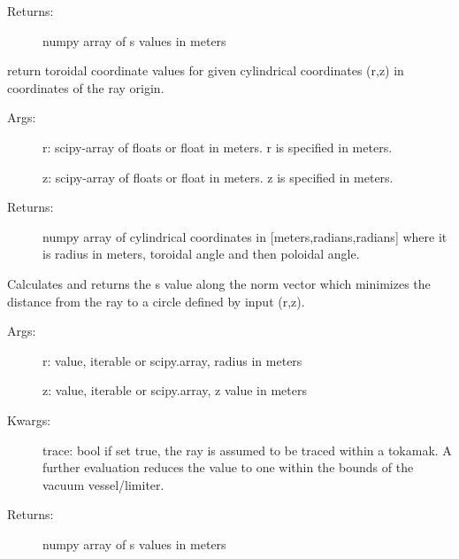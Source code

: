 \documentclass[letterpaper,10pt,english]{sphinxmanual}
\begin{document}
\begin{fulllineitems}
\begin{fulllineitems}
\begin{description}
\item[{Returns:}] \leavevmode
numpy array of s values in meters

\end{description}

\end{fulllineitems}


\begin{fulllineitems}
\label{TRIPPy:TRIPPy.beam.Ray.t}
return toroidal coordinate values for given cylindrical
coordinates (r,z) in coordinates of the ray origin.
\begin{description}
\item[{Args:}] \leavevmode
r: scipy-array of floats or float in meters. r is
specified in meters.

z: scipy-array of floats or float in meters. z is
specified in meters.

\item[{Returns:}] \leavevmode
numpy array of cylindrical coordinates in {[}meters,radians,radians{]}
where it is radius in meters, toroidal angle and then poloidal angle.

\end{description}

\end{fulllineitems}


\begin{fulllineitems}
\label{TRIPPy:TRIPPy.beam.Ray.tmin}
Calculates and returns the s value along the norm vector
which minimizes the distance from the ray to a circle defined by
input (r,z).
\begin{description}
\item[{Args:}] \leavevmode
r: value, iterable or scipy.array, radius in meters

z: value, iterable or scipy.array, z value in meters

\item[{Kwargs:}] \leavevmode
trace: bool if set true, the ray is assumed to be traced within a
tokamak.  A further evaluation reduces the value to one within
the bounds of the vacuum vessel/limiter.

\item[{Returns:}] \leavevmode
numpy array of s values in meters


\end{description}
\end{fulllineitems}
\end{fulllineitems}
\end{document}
